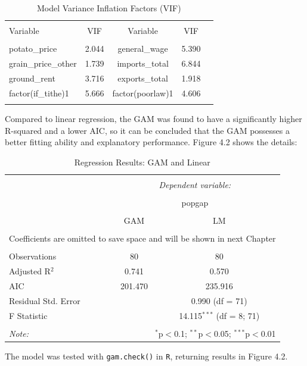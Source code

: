 \begin{table}[!htbp] \centering 
    \caption{Model Variance Inflation Factors (VIF)} 
    \label{vif_table} 
    \begin{tabular}{lcccc} 
    \\[-1.8ex]\hline 
    \hline \\[-1.8ex] 
    Variable & VIF & Variable & VIF \\ 
    \hline \\[-1.8ex] 
    potato\_price & 2.044 & general\_wage & 5.390 \\ 
    grain\_price\_other & 1.739 & imports\_total & 6.844 \\ 
    ground\_rent & 3.716 & exports\_total & 1.918 \\ 
    factor(if\_tithe)1 & 5.666 & factor(poorlaw)1 & 4.606 \\ 
    \hline 
    \hline \\[-1.8ex] 
    \end{tabular} 
  \end{table}

Compared to linear regression, the GAM was found to have a significantly higher R-squared and a lower AIC, so it can be concluded that the GAM possesses a better fitting ability and explanatory performance. Figure 4.2 shows the details:

\begin{table}[h] 
    \centering 
    \caption{Regression Results: GAM and Linear} 
  \begin{tabular}{@{\extracolsep{5pt}}lcc} 
  \\[-1.8ex]\hline 
  \hline \\[-1.8ex] 
   & \multicolumn{2}{c}{\textit{Dependent variable:}} \\ 
  \cline{2-3} 
  \\[-1.8ex] & \multicolumn{2}{c}{popgap} \\ 
  \hline \\[-1.8ex] 
   & GAM & LM \\ 
  \hline \\[-1.8ex] 
  \multicolumn{3}{c}{Coefficients are omitted to save space and will be shown in next Chapter} \\
  \hline \\[-1.8ex] 
  Observations & 80 & 80 \\ 
  Adjusted R$^{2}$ & 0.741 & 0.570 \\ 
  AIC & 201.470 & 235.916\\
  Residual Std. Error &  & 0.990 (df = 71) \\ 
  F Statistic &  & 14.115$^{***}$ (df = 8; 71) \\ 
  \hline 
  \hline \\[-1.8ex] 
  \textit{Note:}  & \multicolumn{2}{r}{$^{*}$p$<$0.1; $^{**}$p$<$0.05; $^{***}$p$<$0.01} \\ 
  \end{tabular} 
\end{table} 
The model was tested with \texttt{gam.check()} in \texttt{R}, returning results in Figure 4.2.

